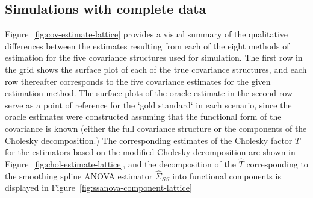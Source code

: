 \subsection{Simulations with complete data}
Figure~\ref{fig:cov-estimate-lattice} provides a visual summary of the qualitative differences between the estimates resulting from each of the eight methods of estimation for the five covariance structures used for simulation. The first row in the grid shows the surface plot of each of the true covariance structures, and each row thereafter corresponds to the five covariance estimates for the given estimation method. The surface plots of the oracle estimate in the second row serve as a point of reference for the `gold standard` in each scenario, since the oracle estimates were constructed assuming that the functional form of the covariance is known (either the full covariance structure or the components of the Cholesky decomposition.) The corresponding estimates of the Cholesky factor $T$ for the estimators based on the modified Cholesky decomposition are shown in Figure~\ref{fig:chol-estimate-lattice}, and the decomposition of the $\hat{T}$ corresponding to the smoothing spline ANOVA estimator $\hat{\Sigma}_{SS}$ into functional components is displayed in Figure~\ref{fig:ssanova-component-lattice}

%

